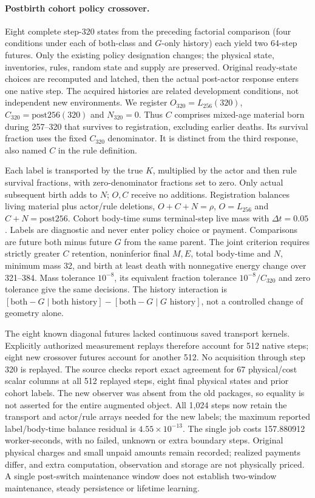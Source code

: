 \paragraph{Postbirth cohort policy crossover.}Eight complete step-320 states from the preceding factorial comparison (four conditions under each of both-class and $G$-only history) each yield two 64-step futures. Only the existing policy designation changes; the physical state, inventories, rules, random state and supply are preserved. Original ready-state choices are recomputed and latched, then the actual post-actor response enters one native step. The acquired histories are related development conditions, not independent new environments. We register $O_{320}=L_{256}(320)$, $C_{320}=\mathrm{post256}(320)$ and $N_{320}=0$. Thus $C$ comprises mixed-age material born during 257--320 that survives to registration, excluding earlier deaths. Its survival fraction uses the fixed $C_{320}$ denominator. It is distinct from the third response, also named $C$ in the rule definition.

Each label is transported by the true $K$, multiplied by the actor and then rule survival fractions, with zero-denominator fractions set to zero. Only actual subsequent birth adds to $N$; $O,C$ receive no additions. Registration balances living material plus actor/rule deletions, $O+C+N=\rho$, $O=L_{256}$ and $C+N=\mathrm{post256}$. Cohort body-time sums terminal-step live mass with $\Delta t=0.05$. Labels are diagnostic and never enter policy choice or payment. Comparisons are future both minus future $G$ from the same parent. The joint criterion requires strictly greater $C$ retention, noninferior final $M,E$, total body-time and $N$, minimum mass 32, and birth at least death with nonnegative energy change over 321--384. Mass tolerance $10^{-8}$, its equivalent fraction tolerance $10^{-8}/C_{320}$ and zero tolerance give the same decisions. The history interaction is $[\mathrm{both}-G\mid\text{both history}]-[\mathrm{both}-G\mid G\text{ history}]$, not a controlled change of geometry alone.

The eight known diagonal futures lacked continuous saved transport kernels. Explicitly authorized measurement replays therefore account for 512 native steps; eight new crossover futures account for another 512. No acquisition through step 320 is replayed. The source checks report exact agreement for 67 physical/cost scalar columns at all 512 replayed steps, eight final physical states and prior cohort labels. The new observer was absent from the old packages, so equality is not asserted for the entire augmented object. All 1,024 steps now retain the transport and actor/rule arrays needed for the new labels; the maximum reported label/body-time balance residual is $4.55\times10^{-13}$. The single job costs 157.880912 worker-seconds, with no failed, unknown or extra boundary steps. Original physical charges and small unpaid amounts remain recorded; realized payments differ, and extra computation, observation and storage are not physically priced. A single post-switch maintenance window does not establish two-window maintenance, steady persistence or lifetime learning.


